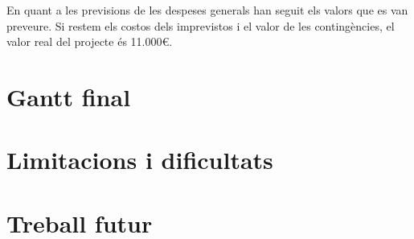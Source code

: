 En quant a les previsions de les despeses generals han seguit els valors que es
van preveure. Si restem els costos dels imprevistos i el valor de les contingències, el valor real del projecte és 11.000\euro.

\section{Gantt final}

\section{Limitacions i dificultats}

\section{Treball futur}

